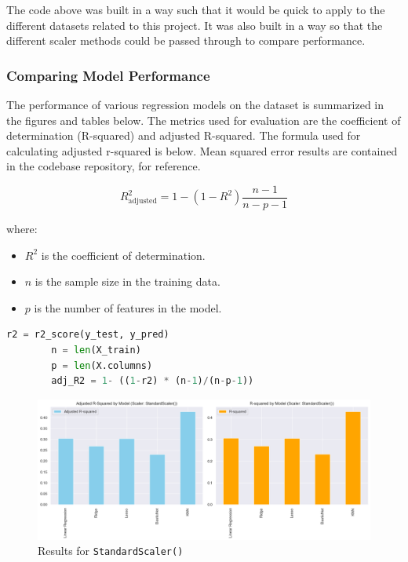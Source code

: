 \documentclass{article}
\theoremstyle{mytheoremstyle}
\theoremstyle{mytheoremstyle}
\theoremstyle{myproblemstyle}
\begin{document}
The code above was built in a way such that it would be quick to apply to the different datasets related to this project. It was also built in a way so that the different scaler methods could be passed through to compare performance.


\subsubsection{Comparing Model Performance}

The performance of various regression models on the dataset is summarized in the figures and tables below. The metrics used for evaluation are the coefficient of determination (R-squared) and adjusted R-squared. The formula used for calculating adjusted r-squared is below. Mean squared error results are contained in the codebase repository, for reference. 



    \[
R_{\text{adjusted}}^2 = 1 - (1 - R^2) \frac{n - 1}{n - p - 1}\]

where:
\begin{itemize}
    \item $R^2$ is the coefficient of determination.
    \item $n$ is the sample size in the training data.
    \item $p$ is the number of features in the model.
\end{itemize}

\begin{lstlisting}[language=Python, caption=R-squared computation within evaluation function]
        r2 = r2_score(y_test, y_pred)
        n = len(X_train)
        p = len(X.columns)
        adj_R2 = 1- ((1-r2) * (n-1)/(n-p-1))
\end{lstlisting}


\begin{figure}[htbp]
\centering
\includegraphics[width=\linewidth]{./Images/evalRegModelStandardScaler.png}
\caption{Results for \texttt{StandardScaler()}}
\label{fig:Standard Scaler Results}
\end{figure}
\end{document}
